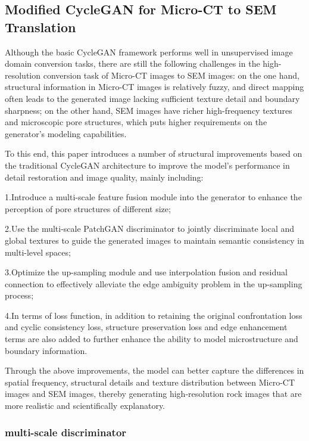\documentclass[a4paper,fleqn]{cas-sc}
\begin{document}
\subsection{Modified CycleGAN for Micro-CT to SEM Translation}

Although the basic CycleGAN framework performs well in unsupervised image domain conversion tasks, there are still the following challenges in the high-resolution conversion task of Micro-CT images to SEM images: on the one hand, structural information in Micro-CT images is relatively fuzzy, and direct mapping often leads to the generated image lacking sufficient texture detail and boundary sharpness; on the other hand, SEM images have richer high-frequency textures and microscopic pore structures, which puts higher requirements on the generator's modeling capabilities.


To this end, this paper introduces a number of structural improvements based on the traditional CycleGAN architecture to improve the model's performance in detail restoration and image quality, mainly including:

1.Introduce a multi-scale feature fusion module into the generator to enhance the perception of pore structures of different size;

2.Use the multi-scale PatchGAN discriminator to jointly discriminate local and global textures to guide the generated images to maintain semantic consistency in multi-level spaces;

3.Optimize the up-sampling module and use interpolation fusion and residual connection to effectively alleviate the edge ambiguity problem in the up-sampling process;

4.In terms of loss function, in addition to retaining the original confrontation loss and cyclic consistency loss, structure preservation loss and edge enhancement terms are also added to further enhance the ability to model microstructure and boundary information.

Through the above improvements, the model can better capture the differences in spatial frequency, structural details and texture distribution between Micro-CT images and SEM images, thereby generating high-resolution rock images that are more realistic and scientifically explanatory. 

\subsubsection{multi-scale discriminator}
\end{document}
